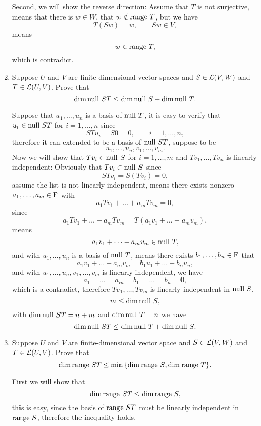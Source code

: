 \begin{enumerate}
\begin{solution}
            Second, we will show the reverse direction: Assume that $T$ is not surjective, means that there is $w \in W$, that $w \notin \text{range}~T$,
            but we have 
            \[ T(Sw) = w, \qquad Sw \in V,\]
            means 
            \[ w \in \text{range}~T, \]
            which is contradict.
        \end{solution}
    \item Suppose $U$ and $V$ are finite-dimensional vector spaces and $S \in \mathcal{L}(V, W)$ and $T \in \mathcal{L}(U, V)$. Prove that 
        \[ \dim{\text{null}~ST} \leq \dim{\text{null}~S} + \dim{\text{null}~T} .\]
        \begin{solution}
            Suppose that $u_1, \ldots, u_n$ is a basis of $\text{null}~T$, it is easy to verify that $u_i \in \text{null}~ST$ for $i=1,\dots,n$ 
            since 
            \[ STu_i = S0 = 0, \qquad i=1,\ldots,n ,\]
            therefore it can extended to be a basis of $\text{null}~ST$, suppose to be 
            \[ u_1, \ldots, u_n, v_1, \ldots, v_m .\]
            Now we will show that $Tv_i \in \text{null}~S$ for $i=1,\ldots,m$ and $Tv_1, \ldots, Tv_n$ is linearly independent:
            Obviously that $Tv_i \in \text{null}~S$ since 
            \[ STv_i = S(Tv_i) = 0,\]
            assume the list is not linearly independent, means there exists nonzero $a_1, \ldots, a_m \in \mathrm{F}$ with 
            \[ a_1Tv_1 + \dots + a_mTv_m = 0, \]
            since 
            \[ a_1Tv_1 + \dots + a_mTv_m = T(a_1v_1 + \dots + a_mv_m ),\]
            means 
            \[ a_1v_1 + \dots + a_mv_m \in \text{null}~T ,\]
            and with $u_1, \ldots, u_n$ is a basis of $\text{null}~T$, means there exists $b_1, \ldots, b_n \in \mathrm{F}$ that 
            \[ a_1v_1 + \dots + a_mv_m = b_1u_1 + \dots + b_nu_n ,\]
            and with $u_1, \ldots, u_n, v_1, \ldots, v_m$ is linearly independent, we have 
            \[ a_1 = \dots = a_m = b_1 = \dots = b_n = 0 ,\]
            which is a contradict, therefore $Tv_1, \ldots, Tv_m$ is linearly independent in $\text{null}~S$, 
            \[ m \leq \dim{\text{null}~S}, \]
            with $\dim{\text{null}~ST} = n + m$ and $\dim{\text{null}~T} = n$ we have 
            \[ \dim{\text{null}~ST} \leq \dim{\text{null}~T} + \dim{\text{null}~S}.\]
        \end{solution}
    \item Suppose $U$ and $V$ are finite-dimensional vector space and $S \in \mathcal{L}(V, W)$ and $T \in \mathcal{L}(U, V)$. Prove that 
        \[ \dim{\text{range}~ST} \leq \min{\{ \dim{\text{range}~S}}, \dim{\text{range}~T} \}.\]
        \begin{solution}
            First we will show that 
            \[ \dim{\text{range}~ST} \leq \dim{\text{range}~S}, \]
            this is easy, since the basis of $\text{range}~ST$ must be linearly independent in $\text{range}~S$, therefore the inequality holds.


\end{solution}
\end{enumerate}
